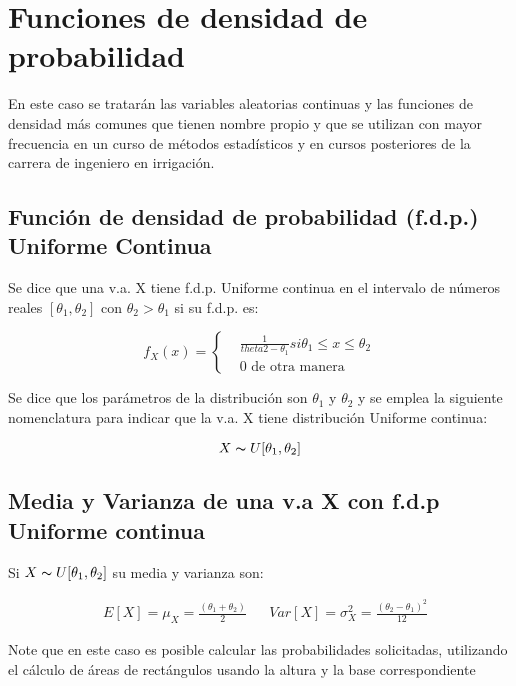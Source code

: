 \section{Funciones de densidad de probabilidad}

En este caso se tratarán las variables aleatorias continuas y las funciones de densidad más comunes que tienen nombre propio y que se utilizan con mayor frecuencia en un curso de métodos estadísticos y en cursos posteriores de la carrera de ingeniero en irrigación.


\subsection{Función de densidad de probabilidad (f.d.p.) Uniforme Continua}

Se dice que una v.a. X tiene f.d.p. Uniforme continua en el
intervalo de números reales $[\theta_1,\theta_2]$ con $\theta_2 > \theta_1$ si su f.d.p. es:

\begin{equation}
    f_X( x )=\begin{cases} & \frac{1}{theta 2-\theta_1} si \theta_1\leq x\leq \theta_2 \\
              & 0 \text{ de otra manera}
    \end{cases}
\end{equation}

Se dice que los parámetros de la distribución son $\theta_1$ y $\theta_2$ y se emplea la siguiente nomenclatura para indicar que la v.a. X tiene distribución Uniforme continua:

\begin{equation}
    X \thicksim  U [\theta_1,\theta_2]
\end{equation}


\subsection{Media y Varianza de una v.a X con f.d.p
    Uniforme continua}

Si $X \thicksim  U[\theta_1,\theta_2]$ su media y varianza son:

\begin{align*}
     & E\left[X\right] =\mu_X=\frac{(\theta_1+\theta_2)}{2} &  & Var\left[X\right] =\sigma_X^2=\frac{(\theta_2-\theta_1)^2}{12}
\end{align*}

Note que en este caso es posible calcular las
probabilidades solicitadas, utilizando el cálculo de áreas
de rectángulos usando la altura y la base
correspondiente



